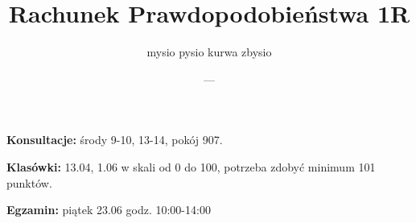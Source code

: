 \documentclass{article}
\title{Rachunek Prawdopodobieństwa 1R}
\author{mysio pysio kurwa zbysio}
\date{---}
\begin{document}
\maketit

\textbf{\color{orange}Konsultacje:} środy 9-10, 13-14, pokój 907.

\textbf{\color{orange}Klasówki:} 13.04, 1.06 w skali od 0 do 100, potrzeba zdobyć minimum 101 punktów.

\textbf{\color{orange}Egzamin:} piątek 23.06 godz. 10:00-14:00
\tableofcontents
\newpage


\newpage


\newpage


\end{document}
